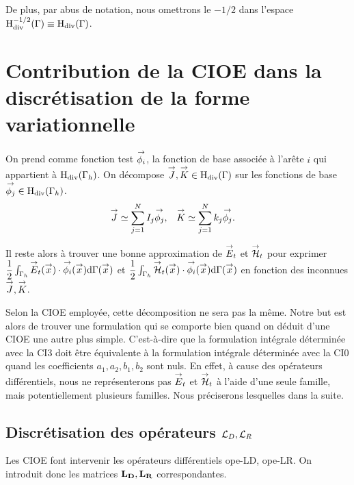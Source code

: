   De plus, par abus de notation, nous omettrons le \(-1/2\) dans l'espace \(\mathrm{H}_\mathrm{div}^{-1/2}(\Gamma)\equiv\mathrm{H}_\mathrm{div}(\Gamma)\).


\section{Contribution de la CIOE dans la discrétisation de la forme variationnelle}

  On prend comme fonction test \({\overset{\rightarrow}{\phi_i}}\), la fonction de base associée à l'arête \(i\) qui appartient à \(\mathrm{H}_\mathrm{div}(\Gamma_h)\).
  On décompose \({\overset{\rightarrow}{J}},{\overset{\rightarrow}{K}} \in \mathrm{H}_\mathrm{div}(\Gamma)\) sur les fonctions de base \({\overset{\rightarrow}{\phi_j}} \in \mathrm{H}_\mathrm{div}(\Gamma_h)\).
    \begin{align*}
      {\overset{\rightarrow}{J}} & \simeq \sum_{j=1}^N I_j {\overset{\rightarrow}{\phi_j}},
      &
      {\overset{\rightarrow}{K}} & \simeq \sum_{j=1}^N k_j {\overset{\rightarrow}{\phi_j}}.
    \end{align*}

  Il reste alors à trouver une bonne approximation de \({\overset{\rightarrow}{E}}_t\) et \({\overset{\rightarrow}{\mathcal{H}}}_t\) pour exprimer \( \dfrac{1}{2} \int_{\Gamma_h} {\overset{\rightarrow}{E}}_t({\overset{\rightarrow}{x}}) \cdot {\overset{\rightarrow}{\phi_i}}({\overset{\rightarrow}{x}}) \mathrm{d}{\Gamma}({\overset{\rightarrow}{x}})\) et \(\dfrac{1}{2} \int_{\Gamma_h} {\overset{\rightarrow}{\mathcal{H}}}_t({\overset{\rightarrow}{x}}) \cdot {\overset{\rightarrow}{\phi_i}}({\overset{\rightarrow}{x}}) \mathrm{d}{\Gamma}({\overset{\rightarrow}{x}})\) en fonction des inconnues \({\overset{\rightarrow}{J}}, {\overset{\rightarrow}{K}}\).

  Selon la CIOE employée, cette décomposition ne sera pas la même.
  Notre but est alors de trouver une formulation qui se comporte bien quand on déduit d'une CIOE une autre plus simple.
  C'est-à-dire que la formulation intégrale déterminée avec la CI3 doit être équivalente à la formulation intégrale déterminée avec la CI0 quand les coefficients \(a_1,a_2,b_1,b_2\) sont nuls.
  En effet, à cause des opérateurs différentiels, nous ne représenterons pas \({\overset{\rightarrow}{E}}_t\) et \({\overset{\rightarrow}{\mathcal{H}}}_t\) à l'aide d'une seule famille, mais potentiellement plusieurs familles.
  Nous préciserons lesquelles dans la suite.

  \subsection[Discrétisation des opérateurs LD, LR]{Discrétisation des opérateurs \({\mathcal{L}_D},{\mathcal{L}_R}\)}
    Les CIOE font intervenir les opérateurs différentiels \gls{ope-LD}, \gls{ope-LR}.
    On introduit donc les matrices \(\mathbf{L_D},\mathbf{L_R}\) correspondantes.

